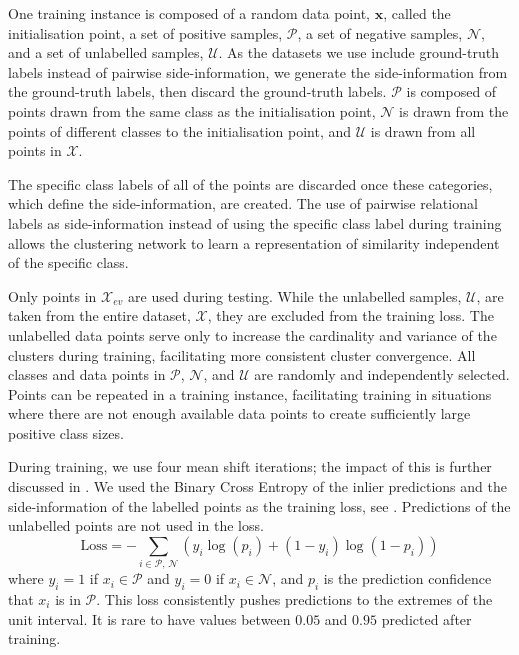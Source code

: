 \documentclass[../thesis.tex]{subfiles}
\begin{document}
One training instance is composed of a random data point, $\mathbf{x}$, called the initialisation point, a set of positive samples, $\mathcal P$, a set of negative samples, $\mathcal N$, and a set of unlabelled samples,  $\mathcal U$. 
As the datasets we use include ground-truth labels instead of pairwise side-information, we generate the side-information from the ground-truth labels, then discard the ground-truth labels.
$\mathcal{P}$ is composed of points drawn from the same class as the initialisation point, $\mathcal{N}$ is drawn from the points of different classes to the initialisation point, and $\mathcal U$ is drawn from all points in $\mathcal{X}$.

The specific class labels of all of the points are discarded once these categories, which define the side-information, are created.
The use of pairwise relational labels as side-information instead of using the specific class label during training allows the clustering network to learn a representation of similarity independent of the specific class.

Only points in $\mathcal{X}_{ev}$ are used during testing.
While the unlabelled samples, $\mathcal U$, are taken from the entire dataset, $\mathcal{X}$, they are excluded from the training loss.
The unlabelled data points serve only to increase the cardinality and variance of the clusters during training, facilitating more consistent cluster convergence.
All classes and data points in $\mathcal P$, $\mathcal N$, and $\mathcal U$ are randomly and independently selected. Points can be repeated in a training instance, 
facilitating training in situations where there are not enough available data points
to create sufficiently large positive class sizes.

During training, we use four mean shift iterations; the impact of this is further discussed in .
We used the Binary Cross Entropy \cite{cox1958regression} 
of the inlier predictions and the side-information of the labelled points as the training loss, see . Predictions of the unlabelled points are not used in the loss. 
\begin{equation}\label{eq__DMS__eq_BCE}
\text{Loss} = -\sum_{i \in{\mathcal P,\, \mathcal N}} (y_i\log(p_i)+(1-y_i)\log(1-p_i)) 
\end{equation}
where $y_i = 1$ if $x_i \in \mathcal P$ and $y_i = 0$ if $x_i \in \mathcal N$, and $p_i$ is the prediction confidence that $x_i$ is in $\mathcal{P}$. This loss consistently pushes predictions to the extremes of the unit interval.
It is rare to have values between $0.05$ and $0.95$ predicted after training.
    
\end{document}
